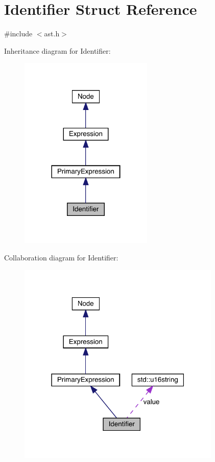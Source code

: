 \hypertarget{struct_identifier}{}\section{Identifier Struct Reference}
\label{struct_identifier}


{\ttfamily \#include $<$ast.\+h$>$}



Inheritance diagram for Identifier\+:
\nopagebreak
\begin{figure}[H]
\begin{center}
\leavevmode
\includegraphics[width=180pt]{struct_identifier__inherit__graph}
\end{center}
\end{figure}


Collaboration diagram for Identifier\+:
\nopagebreak
\begin{figure}[H]
\begin{center}
\leavevmode
\includegraphics[width=274pt]{struct_identifier__coll__graph}
\end{center}
\end{figure}
